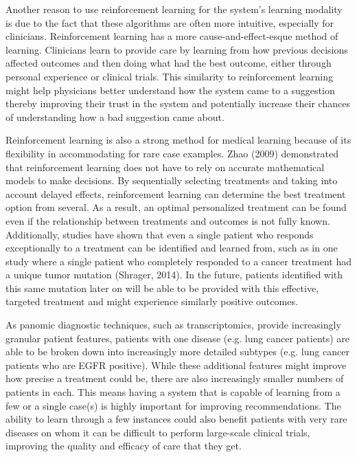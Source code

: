 \documentclass[]{spie}  %
\begin{document}
Another reason to use reinforcement learning for the system’s learning modality is due to the fact that these algorithms are often more intuitive, especially for clinicians. Reinforcement learning has a more cause-and-effect-esque method of learning. Clinicians learn to provide care by learning from how previous decisions affected outcomes and then doing what had the best outcome, either through personal experience or clinical trials. This similarity to reinforcement learning might help physicians better understand how the system came to a suggestion thereby improving their trust in the system and potentially increase their chances of understanding how a bad suggestion came about.

Reinforcement learning is also a strong method for medical learning because of its flexibility in accommodating for rare case examples. Zhao (2009) demonstrated that reinforcement learning does not have to rely on accurate mathematical models to make decisions. By sequentially selecting treatments and taking into account delayed effects, reinforcement learning can determine the best treatment option from several. As a result, an optimal personalized treatment can be found even if the relationship between treatments and outcomes is not fully known. Additionally, studies have shown that even a single patient who responds exceptionally to a treatment can be identified and learned from, such as in one study where a single patient who completely responded to a cancer treatment had a unique tumor mutation (Shrager, 2014). In the future, patients identified with this same mutation later on will be able to be provided with this effective, targeted treatment and might experience similarly positive outcomes.

As panomic diagnostic techniques, such as transcriptomics, provide increasingly granular patient features, patients with one disease (e.g. lung cancer patients) are able to be broken down into increasingly more detailed subtypes (e.g. lung cancer patients who are EGFR positive). While these additional features might improve how precise a treatment could be, there are also increasingly smaller numbers of patients in each. This means having a system that is capable of learning from a few or a single case(s) is highly important for improving recommendations. The ability to learn through a few instances could also benefit patients with very rare diseases on whom it can be difficult to perform large-scale clinical trials, improving the quality and efficacy of care that they get.
\end{document}
